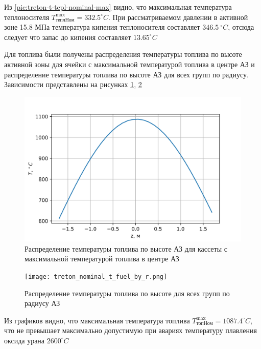  Из \ref{pic:treton-t-tepl-nominal-max} видно, что максимальная температура теплоносителя $T_{\text{тепл} \text{Ном}}^{\max} = 332.5 ^\circ C$.
 При рассматриваемом давлении в активной зоне 15.8 МПа температура кипения теплоносителя составляет $346.5\ ^\circ C$, отсюда следует что запас до кипения составляет $13.65 ^\circ C$

 Для топлива были получены распределения температуры топлива по высоте активной зоны для ячейки с максимальной температурой топлива в центре АЗ и распределение температуры топлива по высоте АЗ для всех групп по радиусу. Зависимости представлены на рисунках \ref{pic:treton-t-fuel-nominal-max}, \ref{pic:treton-t-fuel-nominal-by-r}

\begin{figure}[H]
	\begin{center}
		\includegraphics{treton_nominal_t_fuel_max.png}
		\caption{Распределение температуры топлива по высоте АЗ для кассеты с максимальной температурой топлива в центре АЗ}
		\label{pic:treton-t-fuel-nominal-max} %
	\end{center}
\end{figure}

\begin{figure}[H]
	\begin{center}
		\texttt{[image: treton\_nominal\_t\_fuel\_by\_r.png]}
		\caption{Распределение температуры топлива по высоте для всех групп по радиусу АЗ}
		\label{pic:treton-t-fuel-nominal-by-r} %
	\end{center}
\end{figure}

Из графиков видно, что максимальная температура топлива
$T_{\text{топ} \text{Ном}}^{\max} = 1087.4 ^\circ C$, что не превышает максимально допустимую при авариях температуру плавления оксида урана $2600 ^\circ C$

